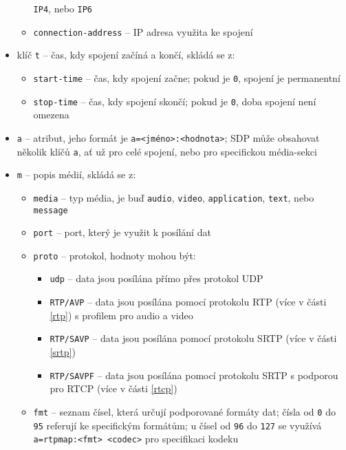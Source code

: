 \begin{itemize}
\begin{itemize}
		            \texttt{IP4}, nebo \texttt{IP6}
		      \item \texttt{connection-address} -- IP adresa využita
		            ke spojení
	      \end{itemize}
	\item klíč \texttt{t} -- čas, kdy spojení začíná a končí, skládá
	      se z:
	      \begin{itemize}
		      \item \texttt{start-time} -- čas, kdy spojení začne; pokud je
		            \texttt{0}, spojení je permanentní
		      \item \texttt{stop-time} -- čas, kdy spojení skončí; pokud je
		            \texttt{0}, doba spojení není omezena
	      \end{itemize}
	\item \texttt{a} -- atribut, jeho formát je
	      \texttt{a=<jméno>:<hodnota>}; SDP může obsahovat několik
	      klíčů \texttt{a}, ať už pro celé spojení, nebo pro
	      specifickou média-sekci
	\item \texttt{m} -- popis médií, skládá se z:
	      \begin{itemize}
		      \item \texttt{media} -- typ média, je buď
		            \texttt{audio}, \texttt{video},
		            \texttt{application}, \texttt{text},
		            nebo \texttt{message}
		      \item \texttt{port} -- port, který je využit k posílání
		            dat
		      \item \texttt{proto} -- protokol, hodnoty mohou být:
		            \begin{itemize}
			            \item \texttt{udp} -- data jsou posílána přímo
			                  přes protokol UDP
			            \item \texttt{RTP/AVP} -- data jsou posílána
			                  pomocí protokolu RTP (více v části \ref{rtp}) s
			                  profilem pro audio a video
			            \item \texttt{RTP/SAVP} -- data jsou posílána
			                  pomocí protokolu SRTP (více v části \ref{srtp})
			            \item \texttt{RTP/SAVPF} -- data jsou posílána
			                  pomocí protokolu SRTP s podporou pro RTCP (více v
			                  části \ref{rtcp})
		            \end{itemize}
		      \item \texttt{fmt} -- seznam čísel, která určují
		            podporované formáty dat; čísla od \texttt{0} do
		            \texttt{95} referují ke specifickým formátům; u
		            čísel od \texttt{96} do \texttt{127} se
		            využívá \texttt{a=rtpmap:<fmt> <codec>} pro
		            specifikaci kodeku
	      \end{itemize}
\end{itemize}

